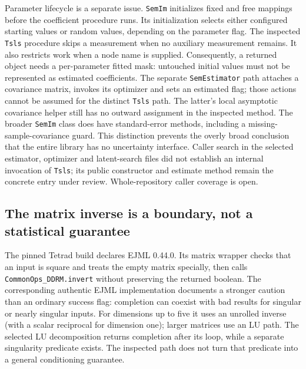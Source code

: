 Parameter lifecycle is a separate issue. \texttt{SemIm} initializes fixed and free mappings before the coefficient procedure runs. Its initialization selects either configured starting values or random values, depending on the parameter flag. The inspected \texttt{Tsls} procedure skips a measurement when no auxiliary measurement remains. It also restricts work when a node name is supplied. Consequently, a returned object needs a per-parameter fitted mask: untouched initial values must not be represented as estimated coefficients. The separate \texttt{SemEstimator} path attaches a covariance matrix, invokes its optimizer and sets an estimated flag; those actions cannot be assumed for the distinct \texttt{Tsls} path. The latter's local asymptotic covariance helper still has no outward assignment in the inspected method. The broader \texttt{SemIm} class does have standard-error methods, including a missing-sample-covariance guard. This distinction prevents the overly broad conclusion that the entire library has no uncertainty interface. Caller search in the selected estimator, optimizer and latent-search files did not establish an internal invocation of \texttt{Tsls}; its public constructor and estimate method remain the concrete entry under review. Whole-repository caller coverage is open.~\citep{exec25_javaiv_tetrad,exec22_java_latent_iv_preflight}

\subsection{The matrix inverse is a boundary, not a statistical guarantee}

The pinned Tetrad build declares EJML 0.44.0. Its matrix wrapper checks that an input is square and treats the empty matrix specially, then calls \texttt{CommonOps\_DDRM.invert} without preserving the returned boolean. The corresponding authentic EJML implementation documents a stronger caution than an ordinary success flag: completion can coexist with bad results for singular or nearly singular inputs. For dimensions up to five it uses an unrolled inverse (with a scalar reciprocal for dimension one); larger matrices use an LU path. The selected LU decomposition returns completion after its loop, while a separate singularity predicate exists. The inspected path does not turn that predicate into a general conditioning guarantee.~\citep{exec25_javaiv_tetrad,exec25_javaiv_ejml}

